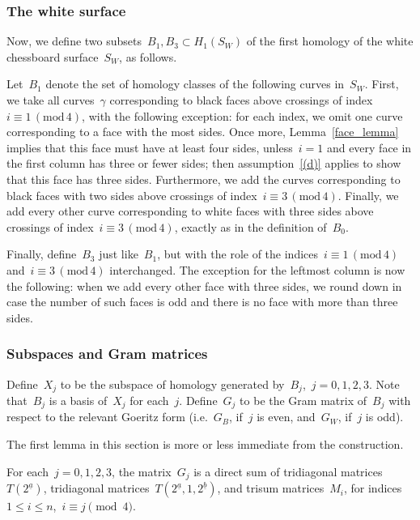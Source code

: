 \documentclass[AHL,Unicode,longabstracts,published]{cedram}
\newcommand{\rmod}{\mathrm{mod}}
\begin{document}
\subsubsection{The white surface}
Now, we define two subsets~$B_1, B_3 \subset H_1(S_W)$ of the first homology of the white chessboard surface~$S_W$, as follows.

Let~$B_1$ denote the set of homology classes of the following curves in~$S_W$. First, we take all curves~$\gamma$ corresponding to black faces above crossings of index~$i\equiv1\,(\rmod\,4)$, with the following exception: for each index, we omit one curve corresponding to a face with the most sides. Once more, Lemma~\ref{face_lemma} implies that this face must have at least four sides, unless~$i=1$ and every face in the first column has three or fewer sides; then assumption~\eqref{(d)} applies to show that this face has three sides. Furthermore, we add the curves corresponding to black faces with two sides above crossings of index~$i\equiv3\,(\rmod\,4)$. Finally, we add every other curve corresponding to white faces with three sides above crossings of index~$i\equiv3\,(\rmod\,4)$, exactly as in the definition of~$B_0$.

Finally, define~$B_3$ just like~$B_1$, but with the role of the indices~$i\equiv1\,(\rmod\,4)$ and~$i\equiv3\,(\rmod\,4)$ interchanged. The exception for the leftmost column is now the following: when we add every other face with three sides, we round down in case the number of such faces is odd and there is no face with more than three sides.

\subsubsection{Subspaces and Gram matrices}

Define~$X_j$ to be the subspace of homology generated by~$B_j$,~$j=0,1,2,3$. Note that~$B_j$ is a basis of~$X_j$ for each~$j$. Define~$G_j$ to be the Gram matrix of~$B_j$ with respect to the relevant Goeritz form (i.e.~$G_B$, if~$j$ is even, and~$G_W$, if~$j$ is odd).


The first lemma in this section is more or less immediate from the construction.

\begin{lemm}\label{form_lem}
For each~$j=0,1,2,3$, the matrix~$G_j$ is a direct sum of tridiagonal matrices~$T(2^{\underline a})$, tridiagonal matrices~$T(2^{\underline a},1,2^{\underline b})$, and trisum matrices~$M_i$, for indices~$1 \le i \le n$,~$i \equiv j \pmod 4$.
\end{lemm}
\end{document}
